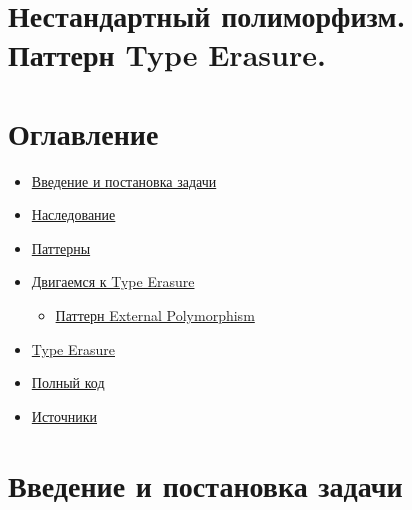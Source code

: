 \documentclass[14pt,a4paper]{article}
\providecommand{\tightlist}{%
	\setlength{\itemsep}{0pt}\setlength{\parskip}{0pt}}
\begin{document}
\hypertarget{ux43dux435ux441ux442ux430ux43dux434ux430ux440ux442ux43dux44bux439-ux43fux43eux43bux438ux43cux43eux440ux444ux438ux437ux43c.-ux43fux430ux442ux442ux435ux440ux43d-type-erasure.}{%
\section{Нестандартный полиморфизм. Паттерн Type
Erasure.}\label{ux43dux435ux441ux442ux430ux43dux434ux430ux440ux442ux43dux44bux439-ux43fux43eux43bux438ux43cux43eux440ux444ux438ux437ux43c.-ux43fux430ux442ux442ux435ux440ux43d-type-erasure.}}

\hypertarget{ux43eux433ux43bux430ux432ux43bux435ux43dux438ux435}{%
\section{Оглавление}\label{ux43eux433ux43bux430ux432ux43bux435ux43dux438ux435}}

\begin{itemize}
\tightlist
\item
  \protect\hyperlink{ux432ux432ux435ux434ux435ux43dux438ux435-ux438-ux43fux43eux441ux442ux430ux43dux43eux432ux43aux430-ux437ux430ux434ux430ux447ux438}{Введение
  и постановка задачи}
\item
  \protect\hyperlink{ux43dux430ux441ux43bux435ux434ux43eux432ux430ux43dux438ux435}{Наследование}
\item
  \protect\hyperlink{ux43fux430ux442ux442ux435ux440ux43dux44b}{Паттерны}
\item
  \protect\hyperlink{ux434ux432ux438ux433ux430ux435ux43cux441ux44f-ux43a-type-erasure}{Двигаемся
  к Type Erasure}

  \begin{itemize}
  \tightlist
  \item
    \protect\hyperlink{ux43fux430ux442ux442ux435ux440ux43d-external-polymorphism}{Паттерн
    External Polymorphism}
  \end{itemize}
\item
  \protect\hyperlink{type-erasure}{Type Erasure}
\item
  \protect\hyperlink{ux43fux43eux43bux43dux44bux439-ux43aux43eux434}{Полный
  код}
\item
  \protect\hyperlink{ux438ux441ux442ux43eux447ux43dux438ux43aux438}{Источники}
\end{itemize}

\hypertarget{ux432ux432ux435ux434ux435ux43dux438ux435-ux438-ux43fux43eux441ux442ux430ux43dux43eux432ux43aux430-ux437ux430ux434ux430ux447ux438}{%
\section{Введение и постановка
задачи}\label{ux432ux432ux435ux434ux435ux43dux438ux435-ux438-ux43fux43eux441ux442ux430ux43dux43eux432ux43aux430-ux437ux430ux434ux430ux447ux438}}
\end{document}
